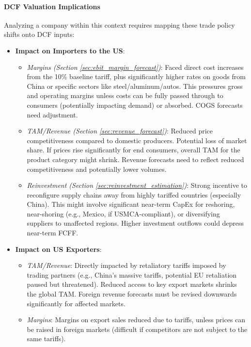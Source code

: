\paragraph{DCF Valuation Implications}
Analyzing a company within this context requires mapping these trade policy shifts onto DCF inputs:

\begin{itemize}
    \item \textbf{Impact on Importers to the US}:
          \begin{itemize}
              \item \textit{Margins (Section \ref{sec:ebit_margin_forecast})}: Faced direct cost increases from the 10\% baseline tariff, plus significantly higher rates on goods from China or specific sectors like steel/aluminum/autos. This pressures gross and operating margins unless costs can be fully passed through to consumers (potentially impacting demand) or absorbed. COGS forecasts need adjustment.
              \item \textit{TAM/Revenue (Section \ref{sec:revenue_forecast})}: Reduced price competitiveness compared to domestic producers. Potential loss of market share. If prices rise significantly for end consumers, overall TAM for the product category might shrink. Revenue forecasts need to reflect reduced competitiveness and potentially lower volumes.
              \item \textit{Reinvestment (Section \ref{sec:reinvestment_estimation})}: Strong incentive to reconfigure supply chains away from highly tariffed countries (especially China). This might involve significant near-term CapEx for reshoring, near-shoring (e.g., Mexico, if USMCA-compliant), or diversifying suppliers to unaffected regions. Higher investment outflows could depress near-term FCFF.
          \end{itemize}

    \item \textbf{Impact on US Exporters}:
          \begin{itemize}
              \item \textit{TAM/Revenue}: Directly impacted by retaliatory tariffs imposed by trading partners (e.g., China's massive tariffs, potential EU retaliation paused but threatened). Reduced access to key export markets shrinks the global TAM. Foreign revenue forecasts must be revised downwards significantly for affected markets.
              \item \textit{Margins}: Margins on export sales reduced due to tariffs, unless prices can be raised in foreign markets (difficult if competitors are not subject to the same tariffs).
          \end{itemize}


\end{itemize}
